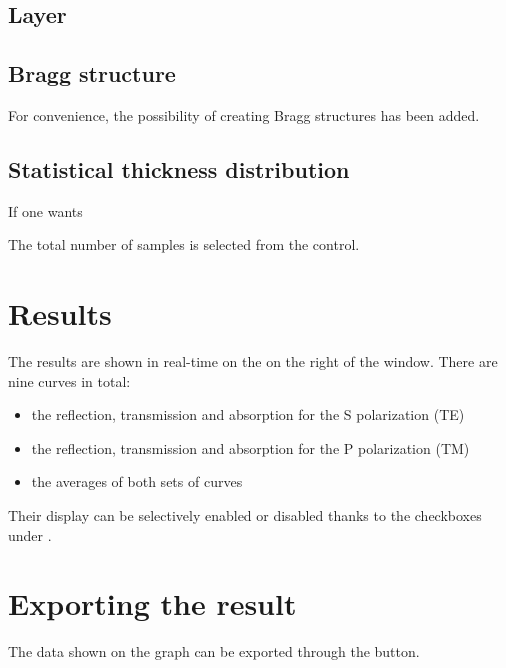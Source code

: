 \subsection{Layer}



\subsection{Bragg structure}

For convenience, the possibility of creating Bragg structures has been added.

\subsection{Statistical thickness distribution}

If one wants 

The total number of samples is selected from the  control. 

\section{Results}

The results are shown in real-time on the on the right of the window. There are nine curves in total:
\begin{itemize}
	\item the reflection, transmission and absorption for the S polarization (TE)
	\item the reflection, transmission and absorption for the P polarization (TM)
	\item the averages of both sets of curves
\end{itemize}
Their display can be selectively enabled or disabled thanks to the checkboxes under .

\section{Exporting the result}

The data shown on the graph can be exported through the  button.